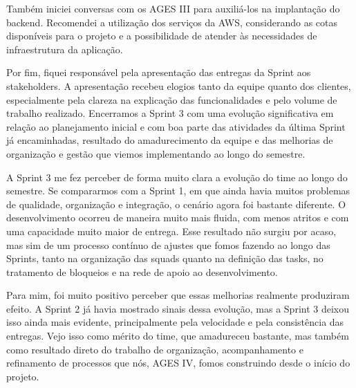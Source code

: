 \indent Também iniciei conversas com os AGES III para auxiliá-los na implantação do backend. Recomendei a utilização dos serviços da AWS, considerando as cotas disponíveis para o projeto e a possibilidade de atender às necessidades de infraestrutura da aplicação.\par

\indent Por fim, fiquei responsável pela apresentação das entregas da Sprint aos stakeholders. A apresentação recebeu elogios tanto da equipe quanto dos clientes, especialmente pela clareza na explicação das funcionalidades e pelo volume de trabalho realizado. Encerramos a Sprint 3 com uma evolução significativa em relação ao planejamento inicial e com boa parte das atividades da última Sprint já encaminhadas, resultado do amadurecimento da equipe e das melhorias de organização e gestão que viemos implementando ao longo do semestre.\par

\begin{reflection}
\noindent A Sprint 3 me fez perceber de forma muito clara a evolução do time ao longo do semestre. Se compararmos com a Sprint 1, em que ainda havia muitos problemas de qualidade, organização e integração, o cenário agora foi bastante diferente. O desenvolvimento ocorreu de maneira muito mais fluida, com menos atritos e com uma capacidade muito maior de entrega. Esse resultado não surgiu por acaso, mas sim de um processo contínuo de ajustes que fomos fazendo ao longo das Sprints, tanto na organização das squads quanto na definição das tasks, no tratamento de bloqueios e na rede de apoio ao desenvolvimento.\par

\noindent Para mim, foi muito positivo perceber que essas melhorias realmente produziram efeito. A Sprint 2 já havia mostrado sinais dessa evolução, mas a Sprint 3 deixou isso ainda mais evidente, principalmente pela velocidade e pela consistência das entregas. Vejo isso como mérito do time, que amadureceu bastante, mas também como resultado direto do trabalho de organização, acompanhamento e refinamento de processos que nós, AGES IV, fomos construindo desde o início do projeto.\par

\end{reflection}
